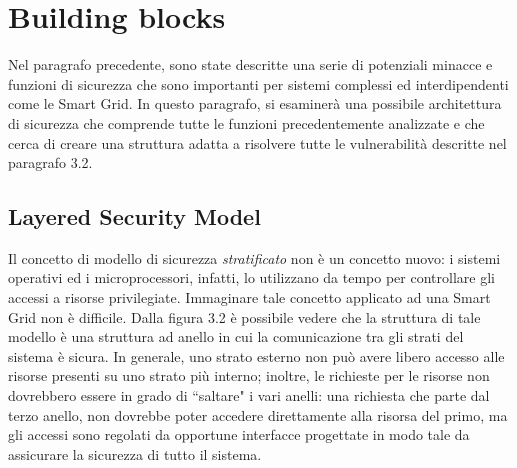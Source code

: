 \section{Building blocks}
Nel paragrafo precedente, sono state descritte una serie di potenziali minacce e funzioni di sicurezza che sono importanti per sistemi complessi ed interdipendenti come le Smart Grid. \newline In questo paragrafo, si esaminerà una possibile architettura di sicurezza che comprende tutte le funzioni precedentemente analizzate e che cerca di creare una struttura adatta a risolvere tutte le vulnerabilità descritte nel paragrafo 3.2.

\subsection{Layered Security Model}
Il concetto di modello di sicurezza \textit{stratificato} non è un concetto nuovo: i sistemi operativi ed i microprocessori, infatti, lo utilizzano da tempo per controllare gli accessi a  risorse privilegiate. \newline Immaginare tale concetto applicato ad una Smart Grid non è difficile. \newline Dalla figura 3.2 è possibile vedere che la struttura di tale modello è una struttura ad anello in cui la comunicazione tra gli strati del sistema è sicura. In generale, uno strato esterno non può avere libero accesso alle risorse presenti su uno strato più interno; inoltre, le richieste per le risorse non dovrebbero essere in grado di ``saltare" i vari anelli: una richiesta che parte dal terzo anello, non dovrebbe poter accedere direttamente alla risorsa del primo, ma gli accessi sono regolati da opportune interfacce progettate in modo tale da assicurare la sicurezza di tutto il sistema.

\begin{figure}[h]
\end{figure}

